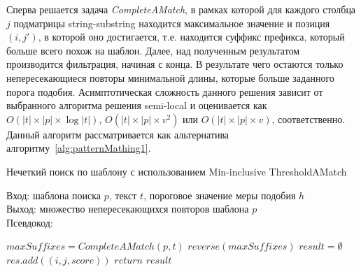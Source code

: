Сперва решается задача \emph{CompleteAMatch}, в рамках которой для каждого столбца $j$ подматрицы string-substring находится максимальное значение и позиция $(i,j')$, в которой оно достигается, т.е. находится суффикс префикса, который больше всего похож на шаблон.
Далее, над полученным результатом производится фильтрация, начиная с конца.
В результате чего остаются только непересекающиеся повторы минимальной длины, которые больше заданного порога подобия.
Асимптотическая сложность данного решения зависит от выбранного алгоритма решения semi-local и оценивается как  $O(|t| \times |p| \times \log |t|)$, $O(|t| \times |p| \times v^2)$ или $O(|t| \times |p| \times v)$, 
соответственно.
Данный алгоритм рассматривается как альтернатива алгоритму~\ref{alg:patternMathing1}.

\begin{algorithm}[b!]
\caption{Нечеткий поиск по шаблону с использованием Min-inclusive ThresholdAMatch}\label{alg:patternMathing2}
Вход: шаблона поиска $p$, текст $t$, пороговое значение меры подобия $h$\\
Выход: множество непересекающихся повторов шаблона $p$\\
Псевдокод:
\begin{algorithmic}[1]
\State $maxSuffixes= CompleteAMatch(p,t)$
\State $reverse(maxSuffixes)$
\State $result = \emptyset$
    \State $res.add((i,j,score))$ 
    \EndIf
\EndFor
\State $return$ $result$

\end{algorithmic}
\end{algorithm}


